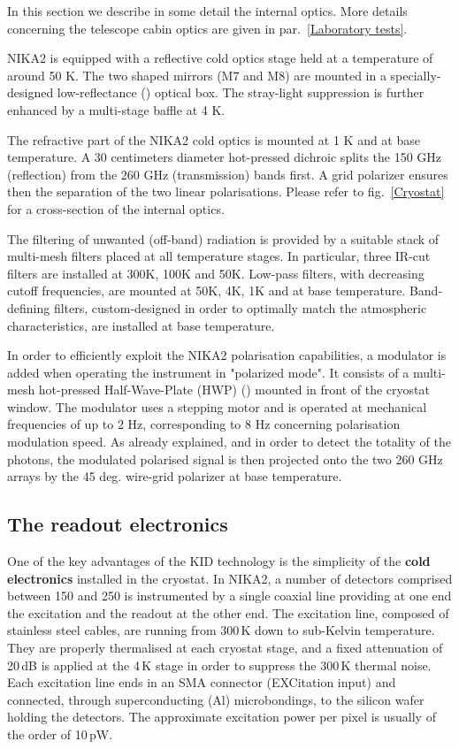 \documentclass[]{aa} %
\begin{document}
In this section we describe in some detail the internal optics. More details concerning the telescope cabin optics are given in par.~\ref{Laboratory tests}.

NIKA2 is equipped with a reflective cold optics stage held at a temperature of around 50 K. The two shaped mirrors (M7 and M8) are mounted in a specially-designed low-reflectance (\cite{Calvo2010}) optical box. The stray-light suppression is further enhanced by a multi-stage baffle at 4 K.

The refractive part of the NIKA2 cold optics is mounted at 1 K and at base temperature. A 30 centimeters diameter hot-pressed dichroic splits the 150 GHz (reflection) from the 260 GHz (transmission) bands first. A grid polarizer ensures then the separation of the two linear polarisations.  Please refer to fig.~\ref{Cryostat} for a cross-section of the internal optics.
 

The filtering of unwanted (off-band) radiation is provided by a suitable stack of multi-mesh filters placed at all temperature stages. In particular, three IR-cut filters are installed at 300K, 100K and 50K. Low-pass filters, with decreasing cutoff frequencies, are mounted at 50K, 4K, 1K and at base temperature. Band-defining filters, custom-designed in order to optimally match the atmospheric characteristics, are installed at base temperature. 

In order to efficiently exploit the NIKA2 polarisation capabilities, a modulator is added when operating the instrument in "polarized mode". It consists of a multi-mesh hot-pressed Half-Wave-Plate (HWP) (\cite{Pisano2016}) mounted in front of the cryostat window. The modulator uses a stepping motor and is operated at mechanical frequencies of up to 2 Hz, corresponding to 8 Hz concerning polarisation modulation speed. As already explained, and in order to detect the totality of the photons, the modulated polarised signal is then projected onto the two 260 GHz arrays by the 45 deg. wire-grid polarizer at base temperature.  


 \subsection{The readout electronics}

One of the key advantages of the KID technology is the simplicity of the {\bf{cold electronics}} installed in the cryostat.
In NIKA2, a number of detectors comprised between 150 and 250 is instrumented by a single coaxial line providing at one end the excitation and the readout at the other end. The excitation line, composed of stainless steel cables, are running from 300\,K down to sub-Kelvin temperature. They are properly thermalised at each cryostat stage, and a fixed attenuation of 20\,dB is applied at the 4\,K stage in order to suppress the 300\,K thermal noise. Each excitation line ends in an SMA connector (EXCitation input) and connected, through superconducting (Al) microbondings, to the silicon wafer holding the detectors. The approximate excitation power per pixel is usually of the order of 10\,pW.
\end{document}
